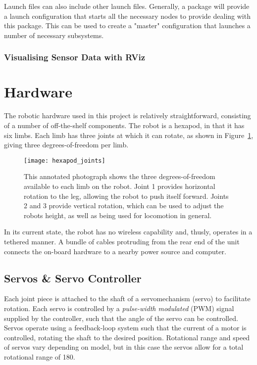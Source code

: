 Launch files can also include other launch files. Generally, a package will provide a launch configuration that starts all the necessary nodes to provide dealing with this package. This can be used to create a "master" configuration that launches a number of necessary subsystems.

\subsubsection{Visualising Sensor Data with RViz}



\section{Hardware}

The robotic hardware used in this project is relatively straightforward, consisting of a number of off-the-shelf components. The robot is a hexapod, in that it has six limbs. Each limb has three joints at which it can rotate, as shown in Figure~\ref{fig:hexapod_dof}, giving three degrees-of-freedom per limb. 

\begin{figure}[!h]
    \centering
    \texttt{[image: hexapod\_joints]}
    \caption{This annotated photograph shows the three degrees-of-freedom available to each limb on the robot. Joint 1 provides horizontal rotation to the leg, allowing the robot to push itself forward. Joints 2 and 3 provide vertical rotation, which can be used to adjust the robots height, as well as being used for locomotion in general.}
    \label{fig:hexapod_dof}
\end{figure}

In its current state, the robot has no wireless capability and, thusly, operates in a tethered manner. A bundle of cables protruding from the rear end of the unit connects the on-board hardware to a nearby power source and computer.

\subsection{Servos \& Servo Controller}
Each joint piece is attached to the shaft of a servomechanism (servo) to facilitate rotation. Each servo is controlled by a \emph{pulse-width modulated} (PWM) signal supplied by the controller, such that the angle of the servo can be controlled. Servos operate using a feedback-loop system such that the current of a motor is controlled, rotating the shaft to the desired position. Rotational range and speed of servos vary depending on model, but in this case the servos allow for a total rotational range of 180\textdegree.

